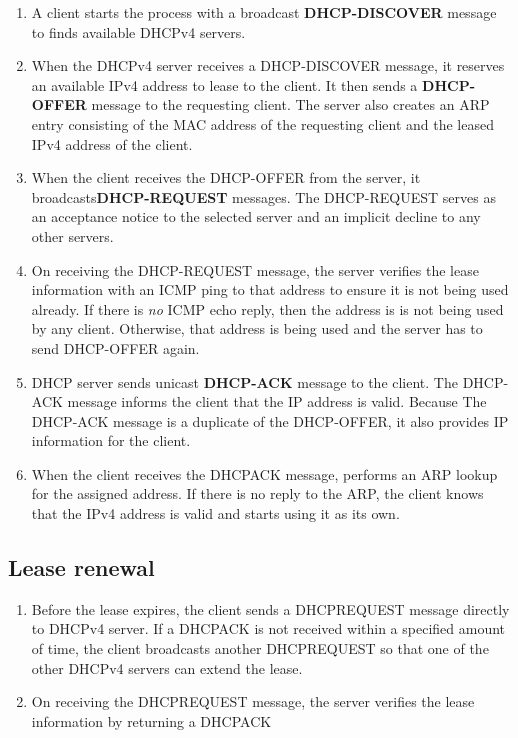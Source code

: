 \begin{enumerate}
\item A client starts the process with a broadcast \textbf{DHCP-DISCOVER} message to finds available DHCPv4 servers.

\item When the DHCPv4 server receives a DHCP-DISCOVER message, it reserves an available IPv4 address to lease to the client. It then sends a \textbf{DHCP-OFFER} message to the requesting client. The server also creates an ARP entry consisting of the MAC address of the requesting client and the leased IPv4 address of the client.

\item When the client receives the DHCP-OFFER from the server, it broadcasts\textbf{DHCP-REQUEST} messages. The DHCP-REQUEST serves as an acceptance notice to the selected server and an implicit decline to any other servers.

\item On receiving the DHCP-REQUEST message, the server verifies the lease information with an ICMP ping to that address to ensure it is not being used already. If there is \emph{no} ICMP echo reply, then the address is is not being used by any client. Otherwise, that address is being used and the server has to send DHCP-OFFER again.

\item DHCP server sends  unicast \textbf{DHCP-ACK} message to the client. The DHCP-ACK message informs the client that the IP address is valid. Because The DHCP-ACK message is a duplicate of the DHCP-OFFER, it also provides IP information for the client.

\item When the client receives the DHCPACK message, performs an ARP lookup for the assigned address.
If there is no reply to the ARP, the client knows that the IPv4 address is valid and starts using it as its own.
\end{enumerate}



\subsection{Lease renewal}

\begin{enumerate}
\item Before the lease expires, the client sends a DHCPREQUEST message directly to DHCPv4 server. If a DHCPACK is not received within a specified amount of time, the client broadcasts another DHCPREQUEST so that one of the other DHCPv4 servers can extend the lease.

\item On receiving the DHCPREQUEST message, the server verifies the lease information by returning a DHCPACK
\end{enumerate}

